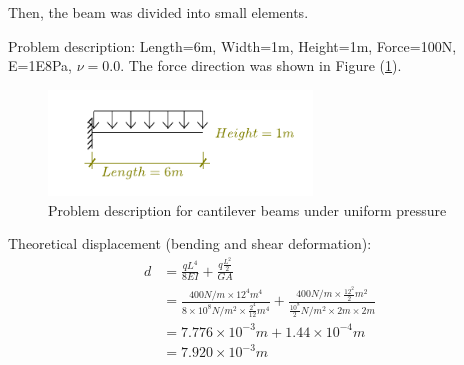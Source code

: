 \documentclass[fleqn,11pt,letter]{article}
\begin{document}

\newpage
Then, the beam was divided into small elements. 


Problem description: Length=6m, Width=1m, Height=1m, Force=100N, E=1E8Pa, $\nu=0.0$. The force direction was shown in Figure (\ref{fig Problem description for cantilever beams under uniform pressure 4}).

\begin{figure}[H]
  \centering
  \includegraphics[width=7cm]{../Figure_files/4NodeANDES/cantilever_6_uniform_load.pdf}
  \caption{Problem description for cantilever beams under uniform pressure  }
  \label{fig Problem description for cantilever beams under uniform pressure 4}
\end{figure}


Theoretical displacement (bending and shear deformation):
\begin{equation}
  \begin{aligned}
  d &=\frac{qL^4}{8EI} + \frac{q \frac{L^2}{2}}{GA} \\ 
    &= \frac{400 N/m \times 12^4 m^4}{8\times 10^8 N/m^2 \times \frac{2^4}{12} m^4} 
       + \frac{400 N/m \times \frac{12^2}{2} m^2} {\frac{10^8}{2} N/m^2 \times 2m\times 2m} \\ 
    &=7.776\times 10^{-3} m  +1.44\times 10^{-4}  m \\
    &=7.920\times 10^{-3} m
   \end{aligned}
\end{equation}
\end{document}
